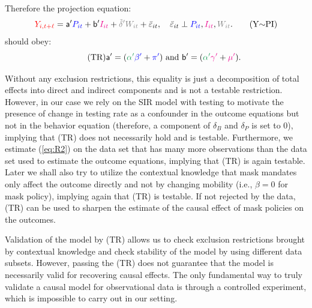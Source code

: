 \documentclass[11pt,reqno,letter]{amsart}
\theoremstyle{definition}
\def\bcolor{\color{ForestGreen}}
\def\pcolor{\color{blue}}
\def\icolor{\color{magenta}}
\def\wcolor{\color{gray}}
\def\ycolor{\color{red}}
\begin{document}
Therefore the projection equation:
\begin{equation}
   {\ycolor  Y_{i,t+\ell}}
   = \mathsf{a}'
    {\pcolor P_{it}} + \mathsf{b}'    {\icolor I_{it} }+ {\wcolor \tilde {\delta} '}{\wcolor W_{it}}  + {\bar \varepsilon}_{it},  \quad   {\bar \varepsilon}_{it} \perp
  {\pcolor P_{it}},  {\icolor I_{it}}, {\wcolor W_{it}}.  \label{eq:PR} \tag{Y$\sim$PI}
\end{equation}
should obey:
\begin{equation}\label{eq:TI} \tag{TR}
 \mathsf{a}'  = ( {\bcolor\alpha '}  {\pcolor \beta' }+{\pcolor\pi'} ) \text{ and }
\mathsf{b}'  = ( {\bcolor\alpha '}  {\icolor \gamma'} + {\icolor \mu'}).
\end{equation}


Without any exclusion restrictions, this equality is just a decomposition of total effects
into direct and indirect components and is not a testable restriction. However, in our case we rely on the SIR
model with testing to motivate the presence of change in testing rate as a confounder in the outcome
equations but not in the behavior equation (therefore, a component of $\delta_B$ and $\delta_P$ is set to 0), implying that (TR) does not necessarily hold and is testable. Furthermore, we estimate (\ref{eq:R2}) on the data set that has many more observations than the data set used to estimate the outcome equations, implying that (TR) is again testable.  Later we  shall also try to
utilize the contextual knowledge that mask mandates  only affect the outcome directly and not by changing mobility (i.e., $\beta=0$ for mask policy), implying again that (TR) is testable. If not rejected by the data, (TR) can be used to sharpen the estimate of the causal effect of mask policies on the outcomes.

Validation of the model by (TR) allows us to check exclusion restrictions brought by contextual knowledge
and check stability of the model by using different data subsets.  However, passing the (TR) does
not guarantee that the model is necessarily valid for recovering causal effects. The only fundamental way to truly validate a causal model for observational data is through a controlled experiment, which is impossible to carry out in our setting. 
\end{document}
